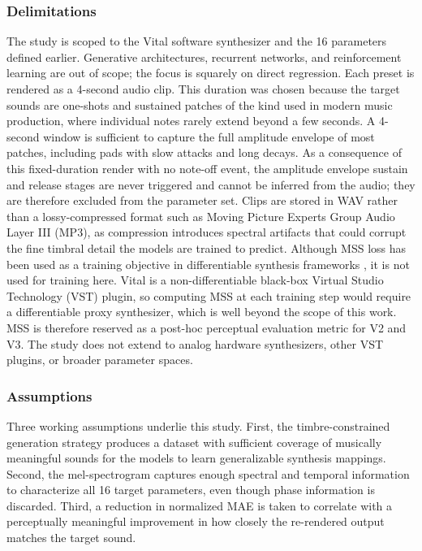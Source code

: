 \subsubsection{Delimitations}
The study is scoped to the Vital software synthesizer and the 16 parameters defined earlier. Generative architectures, recurrent networks, and reinforcement learning are out of scope; the focus is squarely on direct regression. Each preset is rendered as a 4-second audio clip. This duration was chosen because the target sounds are one-shots and sustained patches of the kind used in modern music production, where individual notes rarely extend beyond a few seconds. A 4-second window is sufficient to capture the full amplitude envelope of most patches, including pads with slow attacks and long decays. As a consequence of this fixed-duration render with no note-off event, the amplitude envelope sustain and release stages are never triggered and cannot be inferred from the audio; they are therefore excluded from the parameter set. Clips are stored in WAV rather than a lossy-compressed format such as Moving Picture Experts Group Audio Layer III (MP3), as compression introduces spectral artifacts that could corrupt the fine timbral detail the models are trained to predict. Although MSS loss has been used as a training objective in differentiable synthesis frameworks \cite{engel2020ddsp, caspe2022ddx7}, it is not used for training here. Vital is a non-differentiable black-box Virtual Studio Technology (VST) plugin, so computing MSS at each training step would require a differentiable proxy synthesizer, which is well beyond the scope of this work. MSS is therefore reserved as a post-hoc perceptual evaluation metric for V2 and V3. The study does not extend to analog hardware synthesizers, other VST plugins, or broader parameter spaces.

\subsubsection{Assumptions}
Three working assumptions underlie this study. First, the timbre-constrained generation strategy produces a dataset with sufficient coverage of musically meaningful sounds for the models to learn generalizable synthesis mappings. Second, the mel-spectrogram captures enough spectral and temporal information to characterize all 16 target parameters, even though phase information is discarded. Third, a reduction in normalized MAE is taken to correlate with a perceptually meaningful improvement in how closely the re-rendered output matches the target sound.

